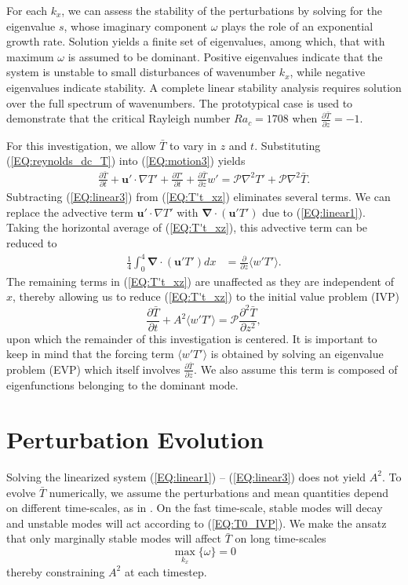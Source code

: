 \documentclass[reprint,amsmath,amssymb,aps]{revtex4-1}
\renewcommand{\vec}[1]{\boldsymbol{#1}}
\newcommand{\grad}{\vec{\nabla}}
\begin{document}
For each $k_x$, we can assess the stability of the perturbations by solving for the eigenvalue $s$, whose imaginary component $\omega$ plays the role of an exponential growth rate. 
Solution yields a finite set of eigenvalues, among which, that with maximum $\omega$ is assumed to be dominant. 
Positive eigenvalues indicate that the system is unstable to small disturbances of wavenumber $k_x$, while negative eigenvalues indicate stability. 
A complete linear stability analysis requires solution over the full spectrum of wavenumbers. 
The prototypical case is used to demonstrate that the critical Rayleigh number $Ra_c = 1708$ when $\frac{\partial \bar{T}}{\partial z} = -1$.

For this investigation, we allow $\bar{T}$ to vary in $z$ and $t$. Substituting (\ref{EQ:reynolds_dc_T}) into (\ref{EQ:motion3}) yields
\begin{align}
    \frac{\partial \bar{T}}{\partial t} + \mathbf{u}' \cdot \nabla T' + \frac{\partial T'}{\partial t} + \frac{\partial \bar{T}}{\partial z} w' = \mathcal{P} \nabla^2 T' + \mathcal{P} \nabla^2 \bar{T}.
    \label{EQ:T't_xz}
\end{align}
Subtracting (\ref{EQ:linear3}) from (\ref{EQ:T't_xz}) eliminates several terms. 
We can replace the advective term $\mathbf{u}' \cdot \nabla T'$ with $\grad \cdot (\mathbf{u}'T')$ due to (\ref{EQ:linear1}). 
Taking the horizontal average of (\ref{EQ:T't_xz}), this advective term can be reduced to
\begin{align}
    \frac{1}{4}\int_0^4 \grad \cdot (\mathbf{u}'T') dx &= \frac{\partial }{\partial z}  \langle w'T' \rangle.
\end{align}
The remaining terms in (\ref{EQ:T't_xz}) are unaffected as they are independent of $x$, thereby allowing us to reduce (\ref{EQ:T't_xz}) to the initial value problem (IVP)
\begin{equation}
    \frac{\partial \bar{T}}{\partial t} + A^2 \langle w'T' \rangle = \mathcal{P}  \frac{\partial^2 \bar{T}}{\partial z^2}, \label{EQ:T0_IVP}
\end{equation}
upon which the remainder of this investigation is centered. 
It is important to keep in mind that the forcing term $\langle w'T' \rangle$ is obtained by solving an eigenvalue problem (EVP) which itself involves $\frac{\partial \bar{T}}{\partial z}$. 
We also assume this term is composed of eigenfunctions belonging to the dominant mode. 

\section{Perturbation Evolution}
Solving the linearized system (\ref{EQ:linear1}) -- (\ref{EQ:linear3}) does not yield $A^2$. 
To evolve $\bar{T}$ numerically, we assume the perturbations and mean quantities depend on different time-scales, as in \cite{Chini_sw}. On the fast time-scale, stable modes will decay and unstable modes will act according to (\ref{EQ:T0_IVP}). 
We make the ansatz that only marginally stable modes will affect $\bar{T}$ on long time-scales
\begin{equation}
    \max_{k_x} \{ \omega \} = 0
\end{equation}
thereby constraining $A^2$ at each timestep.
\end{document}
